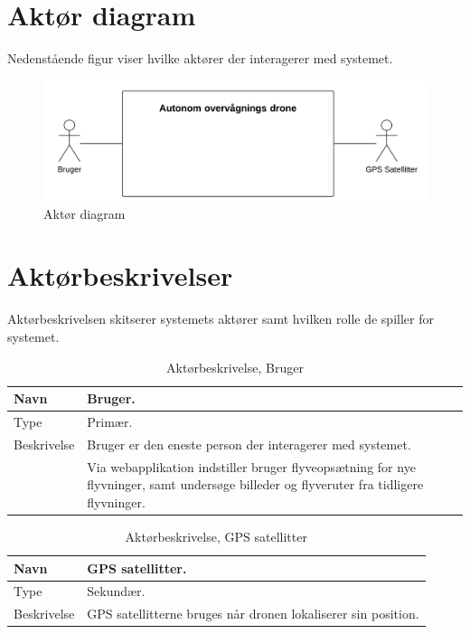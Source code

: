 \section{Aktør diagram}
Nedenstående figur viser hvilke aktører der interagerer med systemet.

\begin{figure}[H]
\centering
\includegraphics[width=1\textwidth]{Billeder/Aktor_diagram.png}
\caption{Aktør diagram}
\label{fig:ATD}
\end{figure}

\section{Aktørbeskrivelser}
Aktørbeskrivelsen skitserer systemets aktører samt hvilken rolle de spiller for systemet.


\begin{table}[H]
\begin{tabular}{|l|p{12.25cm}|} \hline

Navn					& Bruger. 	\\\hline
Type					& Primær.	\\\hline
Beskrivelse				& Bruger er den eneste person der interagerer med systemet.\\
						& Via webapplikation indstiller bruger flyveopsætning for nye flyvninger, samt undersøge billeder og flyveruter fra tidligere flyvninger.\\\hline
						
\end{tabular}
\caption{Aktørbeskrivelse, Bruger}
\label{tab:AB1}
\end{table}


\begin{table}[H]
\begin{tabular}{|l|p{12.25cm}|}
\hline
Navn					& GPS satellitter. 	\\\hline
Type					& Sekundær.	\\\hline
Beskrivelse				& GPS satellitterne bruges når dronen lokaliserer sin position.\\\hline

\end{tabular}
\caption{Aktørbeskrivelse, GPS satellitter}
\label{tab:AB1}
\end{table}